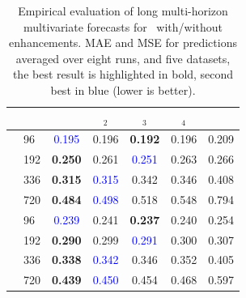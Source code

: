 \begin{table}[ht!] 
\scriptsize
    \begin{center}
    \caption{Empirical evaluation of long multi-horizon multivariate forecasts for \ours\ with/without enhancements. MAE and MSE for predictions averaged over eight runs, and five datasets, the best result is highlighted in bold, second best in blue (lower is better).}
    \label{table:ablation_nhits_contributions}
	\begin{tabular}{ll | ccccc} \toprule
    						&     & \ours                    & \ours$_{2}$             & \ours$_{3}$              & \ours$_{4}$ & \NBEATSi \\ \midrule
\parbox[t]{1mm}{}
							& 96  & \textcolor{blue}{0.195}  & 0.196                   & \textbf{0.192}           & 0.196       & 0.209    \\
							& 192 & \textbf{0.250}           & 0.261                   & \textcolor{blue}{0.251}  & 0.263       & 0.266    \\
							& 336 & \textbf{0.315}           & \textcolor{blue}{0.315} & 0.342                    & 0.346       & 0.408    \\
							& 720 & \textbf{0.484}           & \textcolor{blue}{0.498} & 0.518                    & 0.548       & 0.794    \\ \midrule
\parbox[t]{1mm}{}
							& 96  & \textcolor{blue}{0.239}  & 0.241                   & \textbf{0.237}           & 0.240       & 0.254   \\
							& 192 & \textbf{0.290}           & 0.299                   & \textcolor{blue}{0.291}  & 0.300       & 0.307   \\
							& 336 & \textbf{0.338}           & \textcolor{blue}{0.342} & 0.346                    & 0.352       & 0.405   \\
							& 720 & \textbf{0.439}           & \textcolor{blue}{0.450} & 0.454                    & 0.468       & 0.597   \\ \bottomrule
	\end{tabular}
	\end{center}
\end{table}